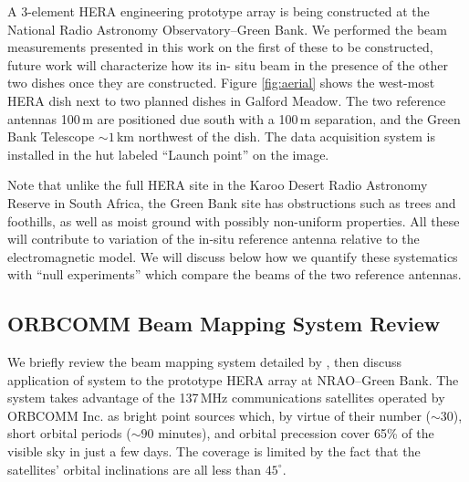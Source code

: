 \documentclass{emulateapj}
\begin{document}
A 3-element HERA engineering prototype array is being constructed at the National Radio 
Astronomy Observatory--Green Bank. We performed the beam measurements presented in 
this work on the first of these to be constructed, future work will characterize how its in-
situ beam in the presence of the other two dishes once they are constructed. Figure 
\ref{fig:aerial} shows the west-most HERA dish next to two planned dishes in Galford 
Meadow. The two reference antennas 100\,m are positioned due south with a 100\,m 
separation, and the Green Bank Telescope $\sim1$\,km northwest of the dish. The data 
acquisition system is installed in the hut labeled ``Launch point'' on the image. 

Note that unlike the full HERA site in the Karoo Desert Radio Astronomy Reserve in 
South Africa, the Green Bank site has obstructions such as trees and foothills, as well as 
moist ground with possibly non-uniform properties. All these will contribute to variation 
of the in-situ reference antenna relative to the electromagnetic model. We will discuss 
below how we quantify these systematics with ``null experiments'' which compare the 
beams of the two reference antennas.


\subsection{ORBCOMM Beam Mapping System Review}

We briefly review the beam mapping system detailed by \citet{neben15}, then discuss 
application of system to the prototype HERA array at NRAO--Green Bank. The system 
takes advantage of the 137\,MHz communications satellites operated by ORBCOMM Inc. 
as bright point sources which, by virtue of their number ($\sim30$), short orbital periods 
($\sim90$ minutes), and orbital precession cover 65\% of the visible sky in just a few 
days. The coverage is limited by the fact that the satellites' orbital inclinations are all less 
than $45^\circ$. 
\end{document}
